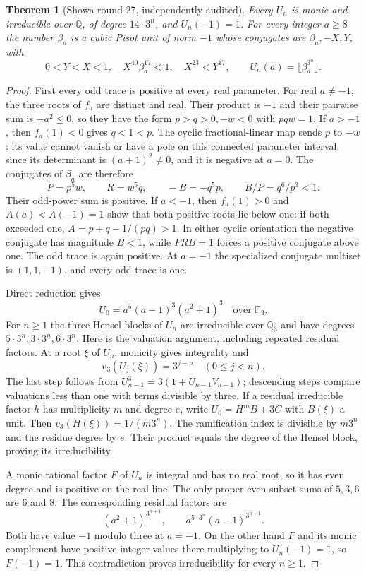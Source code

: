 \documentclass[11pt,a4paper]{article}
\newtheorem{theorem}{Theorem}[section]
\theoremstyle{remark}\newtheorem{remark}[theorem]{Remark}
\begin{document}
\begin{theorem}[Showa round 27, independently audited]
\label{fac:uniform}
Every $U_n$ is monic and irreducible over $\mathbb Q$, of degree
$14\cdot3^n$, and $U_n(-1)=1$. For every integer $a\ge8$ the number
$\beta_a$ is a cubic Pisot unit of norm $-1$ whose conjugates are
$\beta_a,-X,Y$, with
\[
 0<Y<X<1,\quad X^{40}\beta_a^{17}<1,
 \quad X^{23}<Y^{17},\qquad
 U_n(a)=\lfloor\beta_a^{3^n}\rfloor.
\]
\end{theorem}
\begin{proof}
First every odd trace is positive at every real parameter. For real
$a\ne-1$, the three roots of $f_a$ are distinct and real. Their product
is $-1$ and their pairwise sum is $-a^2\le0$, so they have the form
$p>q>0,-w<0$ with $pqw=1$. If $a>-1$, then $f_a(1)<0$ gives
$q<1<p$. The cyclic fractional-linear map sends $p$ to $-w$:
its value cannot vanish or have a pole on this connected parameter
interval, since its determinant is $(a+1)^2\ne0$, and it is negative
at $a=0$. The conjugates of $\beta_a$ are therefore
\[
 P=p^5w,\qquad R=w^5q,\qquad -B=-q^5p,
 \qquad B/P=q^6/p^3<1.
\]
Their odd-power sum is positive. If $a<-1$, then $f_a(1)>0$ and
$A(a)<A(-1)=1$ show that both positive roots lie below one: if both
exceeded one, $A=p+q-1/(pq)>1$. In either cyclic orientation the
negative conjugate has magnitude $B<1$, while $PRB=1$ forces a positive
conjugate above one. The odd trace is again positive. At $a=-1$ the
specialized conjugate multiset is $(1,1,-1)$, and every odd trace is one.

Direct reduction gives
\begin{equation}\label{fac:res}
 \overline U_0=a^5(a-1)^3(a^2+1)^3\quad\text{over }\mathbb F_3.
\end{equation}
For $n\ge1$ the three Hensel blocks of $U_n$ are irreducible over
$\mathbb Q_3$ and have degrees $5\cdot3^n,3\cdot3^n,6\cdot3^n$.
Here is the valuation argument, including repeated residual factors.
At a root $\xi$ of $U_n$, monicity gives integrality and
\[
 v_3(U_j(\xi))=3^{j-n}\quad(0\le j<n).
\]
The last step follows from $U_{n-1}^3=3(1+U_{n-1}V_{n-1})$;
descending steps compare valuations less than one with terms divisible
by three. If a residual irreducible factor $h$ has multiplicity $m$
and degree $e$, write $U_0=H^m B+3C$ with $B(\xi)$ a unit.
Then $v_3(H(\xi))=1/(m3^n)$. The ramification index is divisible by
$m3^n$ and the residue degree by $e$. Their product equals the degree
of the Hensel block, proving its irreducibility.

A monic rational factor $F$ of $U_n$ is integral and has no real root,
so it has even degree and is positive on the real line. The only proper
even subset sums of $5,3,6$ are $6$ and $8$. The corresponding residual
factors are
\[
 (a^2+1)^{3^{n+1}},\qquad
 a^{5\cdot3^n}(a-1)^{3^{n+1}}.
\]
Both have value $-1$ modulo three at $a=-1$. On the other hand $F$ and
its monic complement have positive integer values there multiplying
to $U_n(-1)=1$, so $F(-1)=1$. This contradiction proves irreducibility
for every $n\ge1$.


\end{proof}
\end{document}
